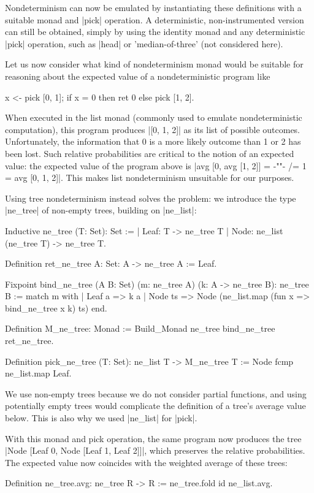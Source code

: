 \documentclass[runningheads]{llncs}
\begin{document}
Nondeterminism can now be emulated by instantiating these definitions with a suitable monad and |pick| operation. A deterministic, non-instrumented version can still be obtained, simply by using the identity monad and any deterministic |pick| operation, such as |head| or 'median-of-three' (not considered here).

Let us now consider what kind of nondeterminism monad would be suitable for reasoning about the expected value of a nondeterministic program like
\begin{code}
  x <- pick [0, 1]; if x = 0 then ret 0 else pick [1, 2].
\end{code}
When executed in the list monad (commonly used to emulate nondeterministic computation), this program
produces |[0, 1, 2]| as its list of possible outcomes. Unfortunately, the information that 0 is a more likely outcome than 1 or 2 has been lost. Such relative probabilities are critical to the notion of an expected value: the expected value of the program above is |avg [0, avg [1, 2]] = {-""-} /= 1 = avg [0, 1, 2]|. This makes list nondeterminism unsuitable for our purposes.

Using tree nondeterminism instead solves the problem: we introduce the type |ne_tree| of non-empty trees, building on |ne_list|: 
\begin{code}
  Inductive ne_tree (T: Set): Set :=
    | Leaf: T -> ne_tree T
    | Node: ne_list (ne_tree T) -> ne_tree T.

  Definition ret_ne_tree {A: Set}: A -> ne_tree A := Leaf.

  Fixpoint bind_ne_tree (A B: Set)
    (m: ne_tree A) (k: A -> ne_tree B): ne_tree B :=
      match m with
      | Leaf a => k a
      | Node ts => Node (ne_list.map (fun x => bind_ne_tree x k) ts)
      end.

  Definition M_ne_tree: Monad := Build_Monad ne_tree bind_ne_tree ret_ne_tree.

  Definition pick_ne_tree (T: Set): ne_list T -> M_ne_tree T
    := Node fcmp ne_list.map Leaf.
\end{code}
We use non-empty trees because we do not consider partial functions, and using potentially empty trees would complicate the definition of a tree's average value below. This is also why we used |ne_list| for |pick|.

With this monad and pick operation, the same program now produces the tree |Node [Leaf 0, Node [Leaf 1, Leaf 2]]|, which preserves the relative probabilities. The expected value now coincides with the weighted average of these trees:
\begin{code}
  Definition ne_tree.avg: ne_tree R -> R := ne_tree.fold id ne_list.avg.
\end{code}
\end{document}
